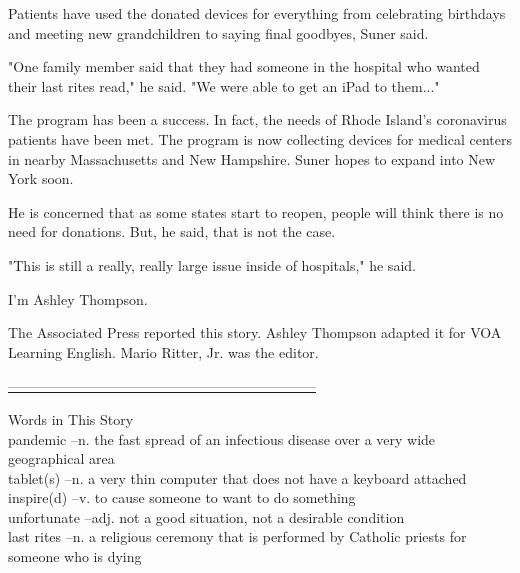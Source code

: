 Patients have used the donated devices for everything from celebrating birthdays and meeting new grandchildren to saying final goodbyes, Suner said.

"One family member said that they had someone in the hospital who wanted their last rites read," he said. "We were able to get an iPad to them..."

The program has been a success. In fact, the needs of Rhode Island's coronavirus patients have been met. The program is now collecting devices for medical centers in nearby Massachusetts and New Hampshire. Suner hopes to expand into New York soon.

He is concerned that as some states start to reopen, people will think there is no need for donations. But, he said, that is not the case.

"This is still a really, really large issue inside of hospitals," he said.

I'm Ashley Thompson.

The Associated Press reported this story. Ashley Thompson adapted it for VOA Learning English. Mario Ritter, Jr. was the editor.

\underline{------------------------------------------------------------------}

Words in This Story \\

pandemic –n. the fast spread of an infectious disease over a very wide geographical area \\

tablet(s) –n. a very thin computer that does not have a keyboard attached \\

inspire(d) –v. to cause someone to want to do something \\

unfortunate –adj. not a good situation, not a desirable condition \\

last rites –n. a religious ceremony that is performed by Catholic priests for someone who is dying \\
